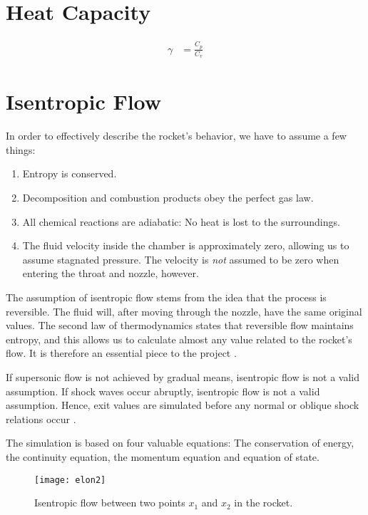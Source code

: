 \section{Heat Capacity}

 \begin{align}
	 \gamma &= \frac{C_p}{C_v}
 \end{align}

\section{Isentropic Flow}

	In order to effectively describe the rocket's behavior, we have to assume a few things:
	\begin{enumerate}[topsep=0pt,itemsep=-1ex,partopsep=1ex,parsep=1ex]
		\item{Entropy is conserved.}
		\item{Decomposition and combustion products obey the perfect gas law.}
		\item{All chemical reactions are adiabatic: No heat is lost to the surroundings.}
		\item{The fluid velocity inside the chamber is approximately zero, allowing us to assume stagnated pressure. The velocity is \emph{not} assumed to be zero when entering the throat and nozzle, however.}
	\end{enumerate}

	The assumption of isentropic flow stems from the idea that the process is reversible. The fluid will, after moving through the nozzle, have the same original values. The second law of thermodynamics states that reversible flow maintains entropy, and this allows us to calculate almost any value related to the rocket's flow. It is therefore an essential piece to the project \cite{nakkanozz}.

	If supersonic flow is not achieved by gradual means, isentropic flow is not a valid assumption. If shock waves occur abruptly, isentropic flow is not a valid assumption. Hence, exit values are simulated before any normal or oblique shock relations occur \cite{nasaisentrop}.

	The simulation is based on four valuable equations: The conservation of energy, the continuity equation, the momentum equation and equation of state.

	\begin{figure}
		\texttt{[image: elon2]}
		\caption{Isentropic flow between two points $x_1$ and $x_2$ in the rocket.}
		\label{fig:isentropicflow}
	\end{figure}


